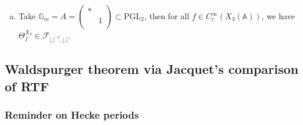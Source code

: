 \documentclass[reqno]{amsart} 
\numberwithin{theorem}{section}
\numberwithin{equation}{section}
\numberwithin{exercise}{section}
\begin{document}
\begin{example}
\begin{enumerate}[(a)]
  \item\label{enumerate:cq6tht7mp9} Take $\mathbb{G}_m = A = \left(
      \begin{smallmatrix}
        \ast&\\
                                &1 \\
      \end{smallmatrix}
    \right) \subset \mathrm{PGL}_2$, then for all $f \in C_c^\infty(X_3(\mathbb{A}))$, we have $\Theta_f^{X_3} \in \mathcal{F}_{\lvert . \rvert^{-1}, \lvert . \rvert}$.
  \end{enumerate}
\end{example}

\subsection{Waldspurger theorem via Jacquet's comparison of RTF}\label{sec:cq6tyal5g1}

\subsubsection{Reminder on Hecke periods}\label{sec:cq6tyal962}
\end{document}
